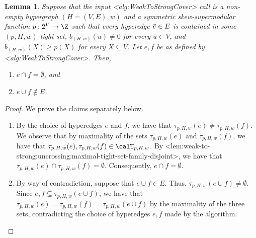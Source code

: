 \documentclass{article}
\def\Cref#1{<#1>}%
\newtheorem{lemma}{Lemma}[section]
\newcommand{\maximalTightSetFamily}[1]{\ensuremath{\calT_{#1}}\xspace}
\newcommand{\maximalTightSetContainingHyperedge}[1]{\ensuremath{\tau_{#1}}\xspace}
\begin{document}
\begin{lemma}\label{lem:WeakToStrongCover:properties-of-e-and-f-chosen-during-alg}
    Suppose that the input \Cref{alg:WeakToStrongCover} call is a non-empty hypergraph $(H = (V, E), w)$ and a symmetric skew-supermodular function $p:2^V\rightarrow \Z$ %
such that every hyperedge $\Tilde{e} \in E$ is contained in some $(p, H, w)$-tight set, $b_{(H,w)}(u) \not = 0$ for every $u \in V$, and $b_{(H,w)}(X) \geq p(X)$ for every $X \subseteq V$.  Let $e, f$ be as defined by \Cref{alg:WeakToStrongCover}. Then,
\begin{enumerate}
    \item $e \cap f = \emptyset$, and
    \item $e\cup f \not \in E$.
\end{enumerate}
\end{lemma}
\begin{proof} We prove the claims separately below.
    \begin{enumerate}
        \item By the choice of hyperedges $e$ and $f$, we have that $\maximalTightSetContainingHyperedge{p, H, w}(e) \not = \maximalTightSetContainingHyperedge{p, H, w}(f)$. We observe that by maximality of the sets $\maximalTightSetContainingHyperedge{p, H, w}(e)$ and $\maximalTightSetContainingHyperedge{p, H, w}(f)$, we have that $\maximalTightSetContainingHyperedge{p, H, w}(e), \maximalTightSetContainingHyperedge{p, H, w}(f) \in \maximalTightSetFamily{p, H, w}$. By \Cref{lem:weak-to-strong:uncrossing:maximal-tight-set-family-disjoint}, we have that $\maximalTightSetContainingHyperedge{p, H, w}(e) \cap  \maximalTightSetContainingHyperedge{p, H, w}(f) = \emptyset$. Consequently, $e \cap f = \emptyset$.
        \item By way of contradiction, suppose that $e\cup f \in E$. Thus, $\maximalTightSetContainingHyperedge{p, H, w}(e\cup f) \not = \emptyset$. Since $e, f \subseteq \maximalTightSetContainingHyperedge{p, H, w}(e\cup f)$, we have that $\maximalTightSetContainingHyperedge{p, H, w}(e) = \maximalTightSetContainingHyperedge{p, H, w}(f) = \maximalTightSetContainingHyperedge{p, H, w}(e\cup f)$ by the maximality of the three sets, contradicting the choice of hyperedges $e, f$ made by the algorithm.
    \end{enumerate}
\end{proof}
\end{document}
